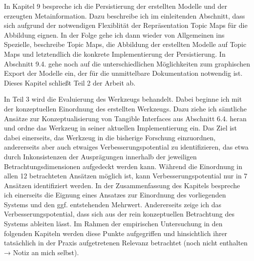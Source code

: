 \todo In Kapitel 9 bespreche ich die Persistierung der erstellten Modelle und der erzeugten Metainformation. Dazu beschreibe ich im einleitenden Abschnitt, dass sich aufgrund der notwendigen Flexiblität der Repräsentation Topic Maps für die Abbildung eignen. In der Folge gehe ich dann wieder von Allgemeinen ins Spezielle, beschreibe Topic Maps, die Abbildung der erstellten Modelle auf Topic Maps und letztendlich die konkrete Implementierung der Persistierung. In Abschnitt 9.4. gehe noch auf die unterschiedlichen Möglichkeiten zum graphischen Export der Modelle ein, der für die unmittelbare Dokumentation notwendig ist. Dieses Kapitel schließt Teil 2 der Arbeit ab.

\todo In Teil 3 wird die Evaluierung des Werkzeugs behandelt. Dabei beginne ich mit der konzeptuellen Einordnung des erstellten Werkzeugs. Dazu ziehe ich sämtliche Ansätze zur Konzeptualisierung von Tangible Interfaces aus Abschnitt 6.4. heran und ordne das Werkzeug in seiner aktuellen Implementierung ein. Das Ziel ist dabei einerseits, das Werkzeug in die bisherige Forschung einzuordnen, andererseits aber auch etwaiges Verbesserungspotential zu identifizieren, das etwa durch Inkonsistenzen der Ausprägungen innerhalb der jeweiligen Betrachtungsdimensionen aufgedeckt werden kann. Während die Einordnung in allen 12 betrachteten Ansätzen möglich ist, kann Verbesserungspotential nur in 7 Ansätzen identifiziert werden. In der Zusammenfassung des Kapitels bespreche ich einerseits die Eignung eines Ansatzes zur Einordnung des vorliegenden Systems und den ggf. entstehenden Mehrwert. Andererseits zeige ich das Verbesserungspotential, dass sich aus der rein konzeptuellen Betrachtung des Systems ableiten lässt. Im Rahmen der empirischen Untersuchung in den folgenden Kapiteln werden diese Punkte aufgegriffen und hinsichtlich ihrer tatsächlich in der Praxis aufgetretenen Relevanz betrachtet (noch nicht enthalten → Notiz an mich selbst).


